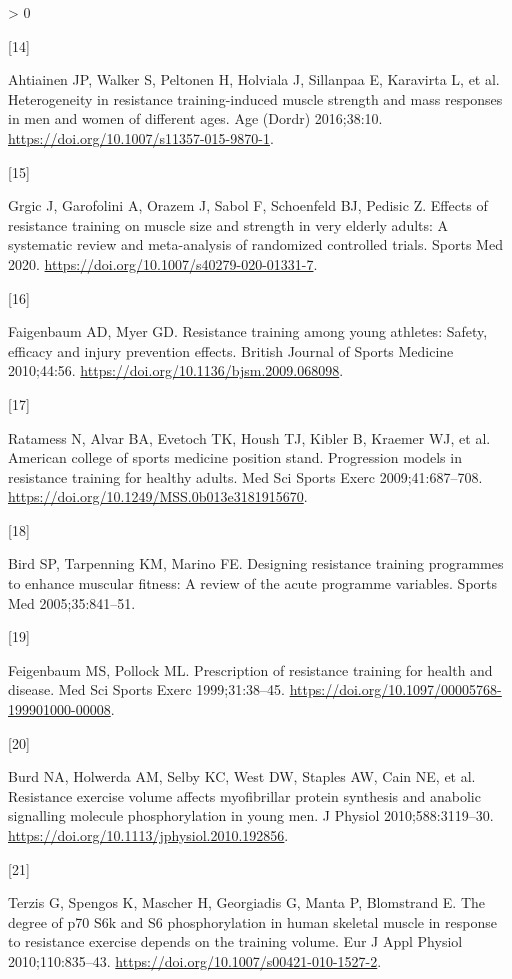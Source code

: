 \documentclass[twoside,10pt]{gihclass} %
\newlength{\cslhangindent}
\newlength{\csllabelwidth}
\newenvironment{CSLReferences}[3] %
 {%
  \setlength{\parindent}{0pt}
  \ifodd #1 \everypar{\setlength{\hangindent}{\cslhangindent}}\ignorespaces\fi
  \ifnum #2 > 0
  \setlength{\parskip}{#2\baselineskip}
  \fi
 }%
 {}
\newcommand{\CSLLeftMargin}[1]{\parbox[t]{\maxof{\widthof{#1}}{\csllabelwidth}}{#1}}
\newcommand{\CSLRightInline}[1]{\parbox[t]{\linewidth}{#1}}
\begin{document}
\begin{CSLReferences}{0}{0}
\leavevmode\hypertarget{ref-RN1741}{}%
\CSLLeftMargin{{[}14{]} }
\CSLRightInline{Ahtiainen JP, Walker S, Peltonen H, Holviala J, Sillanpaa E, Karavirta L, et al. Heterogeneity in resistance training-induced muscle strength and mass responses in men and women of different ages. Age (Dordr) 2016;38:10. \url{https://doi.org/10.1007/s11357-015-9870-1}.}

\leavevmode\hypertarget{ref-RN2534}{}%
\CSLLeftMargin{{[}15{]} }
\CSLRightInline{Grgic J, Garofolini A, Orazem J, Sabol F, Schoenfeld BJ, Pedisic Z. Effects of resistance training on muscle size and strength in very elderly adults: A systematic review and meta-analysis of randomized controlled trials. Sports Med 2020. \url{https://doi.org/10.1007/s40279-020-01331-7}.}

\leavevmode\hypertarget{ref-RN2536}{}%
\CSLLeftMargin{{[}16{]} }
\CSLRightInline{Faigenbaum AD, Myer GD. Resistance training among young athletes: Safety, efficacy and injury prevention effects. British Journal of Sports Medicine 2010;44:56. \url{https://doi.org/10.1136/bjsm.2009.068098}.}

\leavevmode\hypertarget{ref-RN1}{}%
\CSLLeftMargin{{[}17{]} }
\CSLRightInline{Ratamess N, Alvar BA, Evetoch TK, Housh TJ, Kibler B, Kraemer WJ, et al. American college of sports medicine position stand. Progression models in resistance training for healthy adults. Med Sci Sports Exerc 2009;41:687--708. \url{https://doi.org/10.1249/MSS.0b013e3181915670}.}

\leavevmode\hypertarget{ref-RN798}{}%
\CSLLeftMargin{{[}18{]} }
\CSLRightInline{Bird SP, Tarpenning KM, Marino FE. Designing resistance training programmes to enhance muscular fitness: A review of the acute programme variables. Sports Med 2005;35:841--51.}

\leavevmode\hypertarget{ref-RN2538}{}%
\CSLLeftMargin{{[}19{]} }
\CSLRightInline{Feigenbaum MS, Pollock ML. Prescription of resistance training for health and disease. Med Sci Sports Exerc 1999;31:38--45. \url{https://doi.org/10.1097/00005768-199901000-00008}.}

\leavevmode\hypertarget{ref-RN791}{}%
\CSLLeftMargin{{[}20{]} }
\CSLRightInline{Burd NA, Holwerda AM, Selby KC, West DW, Staples AW, Cain NE, et al. Resistance exercise volume affects myofibrillar protein synthesis and anabolic signalling molecule phosphorylation in young men. J Physiol 2010;588:3119--30. \url{https://doi.org/10.1113/jphysiol.2010.192856}.}

\leavevmode\hypertarget{ref-RN784}{}%
\CSLLeftMargin{{[}21{]} }
\CSLRightInline{Terzis G, Spengos K, Mascher H, Georgiadis G, Manta P, Blomstrand E. The degree of p70 S6k and S6 phosphorylation in human skeletal muscle in response to resistance exercise depends on the training volume. Eur J Appl Physiol 2010;110:835--43. \url{https://doi.org/10.1007/s00421-010-1527-2}.}


\end{CSLReferences}
\end{document}
